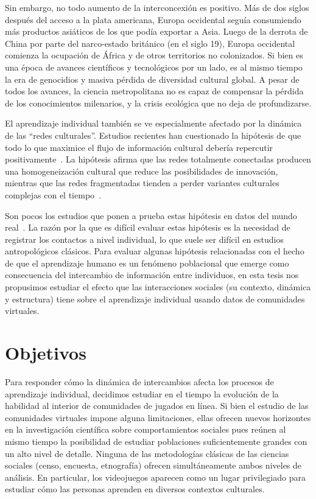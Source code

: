 \documentclass[a4paper,11pt]{book}
\theoremstyle{definition}
\begin{document}

Sin embargo, no todo aumento de la interconcexión es positivo.
%
Más de dos siglos después del acceso a la plata americana, Europa occidental seguía consumiendo más productos asiáticos de los que podía exportar a Asia.
%
Luego de la derrota de China por parte del narco-estado británico (en el siglo 19), Europa occidental comienza la ocupación de África y de otros territorios no colonizados.
%
Si bien es una época de avances científicos y tecnológicos por un lado, es al mismo tiempo la era de genocidios y masiva pérdida de diversidad cultural global.
%
A pesar de todos los avances, la ciencia metropolitana no es capaz de compensar la pérdida de los conocimientos milenarios, y la crisis ecológica que no deja de profundizarse.


El aprendizaje individual también se ve especialmente afectado por la dinámica de las ``redes culturales''.
%
Estudios recientes han cuestionado la hipótesis de que todo lo que maximice el flujo de información cultural debería repercutir positivamente~\cite{Derex2020}.
%
La hipótesis afirma que las redes totalmente conectadas producen una homogeneización cultural que reduce las posibilidades de innovación, mientras que las redes fragmentadas tienden a perder variantes culturales complejas con el tiempo~\cite{padilla2022-interconnectivity,derex2018-divideAndConquer,Creanza2017}.


Son pocos los estudios que ponen a prueba estas hipótesis en datos del mundo real~\cite{migliano2017-hunterGathererNetwork,Derex2020}.
%
La razón por la que es difícil evaluar estas hipótesis es la necesidad de registrar los contactos a nivel individual, lo que suele ser difícil en estudios antropológicos clásicos.
%
Para evaluar algunas hipótesis relacionadas con el hecho de que el aprendizaje humano es un fenómeno poblacional que emerge como consecuencia del intercambio de información entre individuos, en esta tesis nos propusimos estudiar el efecto que las interacciones sociales (su contexto, dinámica y estructura) tiene sobre el aprendizaje individual usando datos de comunidades virtuales.

\section{Objetivos}

Para responder cómo la dinámica de intercambios afecta los procesos de aprendizaje individual, decidimos estudiar en el tiempo la evolución de la habilidad al interior de comunidades de jugados en línea.
%
Si bien el estudio de las comunidades virtuales impone alguna limitaciones, ellas ofrecen nuevos horizontes en la investigación científica sobre comportamientos sociales pues reúnen al mismo tiempo la posibilidad de estudiar poblaciones suficientemente grandes con un alto nivel de detalle.
%
Ninguna de las metodologías clásicas de las ciencias sociales (censo, encuesta, etnografía) ofrecen simultáneamente ambos niveles de análisis.
%
En particular, los videojuegos aparecen como un lugar privilegiado para estudiar cómo las personas aprenden en diversos contextos culturales.
\end{document}
